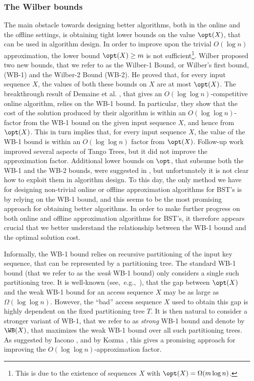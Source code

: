 \documentclass[11pt]{article}
\numberwithin{equation}{section}
\theoremstyle{definition}
\theoremstyle{plain}
\begin{document}
\subsubsection{The Wilber bounds} 

The main obstacle towards designing better algorithms, both in the online and the offline settings, is  obtaining tight lower bounds on the value $\opt(X)$, that can be used in algorithm design. 
%
%
%
In order to improve upon the trivial $O(\log n)$ approximation, the lower bound $\opt(X) \geq m$ is not sufficient\footnote{This is due to the existence of sequences $X$ with $\opt(X) = \Omega(m \log n)$.}. 
Wilber \cite{wilber} proposed two new bounds, that we refer to as the  Wilber-1 Bound, or Wilber's first bound, (WB-1) and the Wilber-2
Bound (WB-2). 
He proved that, for every input sequence $X$, the values of both these bounds on $X$ are at most $\opt(X)$. %
%
The breakthrough result of 
%
Demaine et al. \cite{tango}, that gives
an $O(\log\log n)$-competitive online algorithm, relies on the WB-1 bound. In particular, they show that the cost of the solution produced by their algorithm is within an $O(\log\log n)$-factor from the
WB-1 bound on the given input sequence $X$, and hence from $\opt(X)$. This in turn implies that, for every input sequence $X$, the value of the WB-1 bound is within an $O(\log\log n)$ factor from $\opt(X)$. Follow-up work \cite{multisplay,chain_splay} improved several
aspects of Tango Trees, but it did not improve the approximation factor. Additional lower bounds on $\opt$, that subsume both the WB-1 and the WB-2 bounds, were suggested in \cite{DHIKP09,DSW,Harmon}, but unfortunately it is not clear how to exploit them in algorithm design. %
To this day, the only method we have for designing non-trivial online or offline approximation algorithms for BST's is by relying on the WB-1 bound, and this seems to be the most promising approach for obtaining better algorithms.
In order to make further progress on both online and offline approximation algorithms for BST's, it therefore appears crucial that we better understand the relationship between the WB-1 bound and the optimal solution cost. 

Informally, the WB-1 bound relies on recursive partitioning of the input key sequence, that  can be represented by a partitioning tree. The standard WB-1 bound (that we refer to as the \emph{weak} WB-1 bound)  only considers a single such partitioning tree. It is well-known (see,~e.g.,~\cite{tango,multisplay,in_pursuit}), that the gap between $\opt(X)$
and the weak WB-1 bound for an access sequence $X$ may be as large as  $\Omega(\log\log n)$.  
However, the ``bad'' access sequence $X$ used to obtain this gap is highly dependent on the fixed partitioning tree $T$. It is then natural to consider a stronger variant of WB-1, that we refer to as \emph{strong} WB-1 bound and denote by $\WB(X)$, that maximizes the weak WB-1 bound over all such partitioning trees.
As suggested by  Iacono \cite{in_pursuit}, and by Kozma \cite{Kozma16_thesis}, this gives a promising approach for improving the $O(\log\log n)$-approximation factor. 
\end{document}
